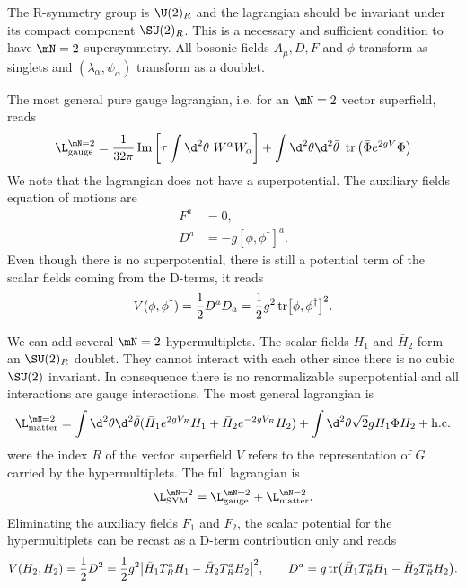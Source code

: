 \documentclass{worksheetclass}
\begin{document}
        The R-symmetry group is $\U(2)_R$ and the lagrangian should be invariant under its compact component $\SU(2)_R$. This is a necessary and sufficient condition to have $\mN=2$ supersymmetry. All bosonic fields $A_\mu,D,F$ and $\phi$ transform as singlets and $(\lambda_\alpha,\psi_\alpha)$ transform as a doublet.

        The most general pure gauge lagrangian, i.e. for an $\mN=2$ vector superfield, reads
        \begin{equation}
            \L^{\mN=2}_{\text{gauge}} = \frac{1}{32\pi}\Im\left[\tau\int\d^2\theta~W^\alpha W_\alpha\right] + \int\d^2\theta\d^2\bar{\theta}~\tr\left(\bar{\Phi}e^{2gV}\Phi\right)\label{eq:N2lag}
        \end{equation}
        We note that the lagrangian does not have a superpotential. The auxiliary fields equation of motions are
        \begin{align}
            F^a &= 0,\\
            D^a &= -g[\phi,\phi^\dagger]^a.
        \end{align}
        Even though there is no superpotential, there is still a potential term of the scalar fields coming from the D-terms, it reads
        \begin{eqnarray}
            V(\phi,\phi^\dagger)=\frac{1}{2}D^aD_a=\frac{1}{2}g^2\tr[\phi,\phi^\dagger]^2.\label{eq:potential}
        \end{eqnarray}

        We can add several $\mN=2$ hypermultiplets. The scalar fields $H_1$ and $\bar{H}_2$ form an $\SU(2)_R$ doublet. They cannot interact with each other since there is no cubic $\SU(2)$ invariant. In consequence there is no renormalizable superpotential and all interactions are gauge interactions. The most general lagrangian is
        \begin{equation}
            \L^{\mN=2}_{\text{matter}} = \int\d^2\theta\d^2\bar{\theta}(\bar{H}_1e^{2gV_R}H_1+\bar{H}_2e^{-2gV_R}H_2)+\int\d^2\theta\sqrt{2}gH_1\Phi H_2+\text{h.c.}
        \end{equation}
        were the index $R$ of the vector superfield $V$ refers to the representation of $G$ carried by the hypermultiplets. The full lagrangian is
        \begin{equation}
            \L^{\mN=2}_{\text{SYM}}=\L^{\mN=2}_{\text{gauge}}+\L^{\mN=2}_{\text{matter}}.
        \end{equation}
        Eliminating the auxiliary fields $F_1$ and $F_2$, the scalar potential for the hypermultiplets can be recast as a D-term contribution only and reads
        \begin{equation}
            V(H_2,H_2)=\frac{1}{2}D^2=\frac{1}{2}g^2\abs{\bar{H}_1T^a_RH_1-\bar{H}_2T^a_RH_2}^2, \qquad D^a=g\tr(\bar{H}_1T^a_RH_1-\bar{H}_2T^a_RH_2).
        \end{equation}
\end{document}
